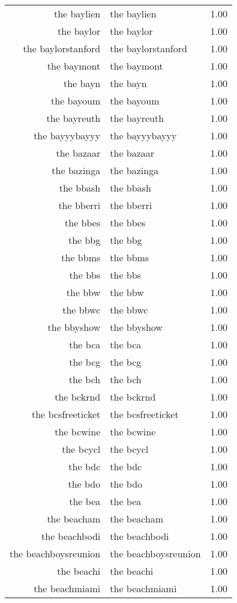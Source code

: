\begin{table}[ht]
\begin{tabular}{rlr}
  the baylien & the baylien & 1.00 \\ 
  the baylor & the baylor & 1.00 \\ 
  the baylorstanford & the baylorstanford & 1.00 \\ 
  the baymont & the baymont & 1.00 \\ 
  the bayn & the bayn & 1.00 \\ 
  the bayoum & the bayoum & 1.00 \\ 
  the bayreuth & the bayreuth & 1.00 \\ 
  the bayyybayyy & the bayyybayyy & 1.00 \\ 
  the bazaar & the bazaar & 1.00 \\ 
  the bazinga & the bazinga & 1.00 \\ 
  the bbash & the bbash & 1.00 \\ 
  the bberri & the bberri & 1.00 \\ 
  the bbes & the bbes & 1.00 \\ 
  the bbg & the bbg & 1.00 \\ 
  the bbms & the bbms & 1.00 \\ 
  the bbs & the bbs & 1.00 \\ 
  the bbw & the bbw & 1.00 \\ 
  the bbwc & the bbwc & 1.00 \\ 
  the bbyshow & the bbyshow & 1.00 \\ 
  the bca & the bca & 1.00 \\ 
  the bcg & the bcg & 1.00 \\ 
  the bch & the bch & 1.00 \\ 
  the bckrnd & the bckrnd & 1.00 \\ 
  the bcsfreeticket & the bcsfreeticket & 1.00 \\ 
  the bcwine & the bcwine & 1.00 \\ 
  the bcycl & the bcycl & 1.00 \\ 
  the bdc & the bdc & 1.00 \\ 
  the bdo & the bdo & 1.00 \\ 
  the bea & the bea & 1.00 \\ 
  the beacham & the beacham & 1.00 \\ 
  the beachbodi & the beachbodi & 1.00 \\ 
  the beachboysreunion & the beachboysreunion & 1.00 \\ 
  the beachi & the beachi & 1.00 \\ 
  the beachmiami & the beachmiami & 1.00 \\ 

\end{tabular}
\end{table}
